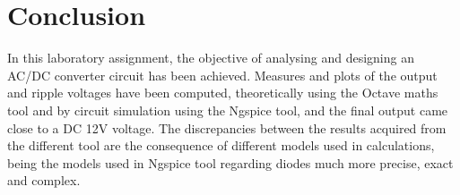 \section{Conclusion}
\label{sec:conclusion}

In this laboratory assignment, the objective of analysing and designing an AC/DC converter circuit has been achieved. Measures and plots of the output and ripple voltages have been computed, theoretically using the Octave maths tool and by circuit simulation using the Ngspice tool, and the final output came close to a DC 12V voltage. The discrepancies between the results acquired from the different tool are the consequence of different models used in calculations, being the models used in Ngspice tool regarding diodes much more precise, exact and complex.


